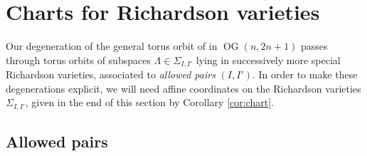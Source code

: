 \documentclass[12pt]{amsart}
\DeclareMathOperator{\OG}{OG}
\newcommand{\CL}[1]{{\color{blue}Carl: #1}}
\begin{document}
\section{Charts for Richardson varieties}\label{sec:charts}

Our degeneration of the general torus orbit of in $\OG(n,2n+1)$ passes through torus orbits of subspaces $\Lambda\in\Sigma_{I,I'}$ lying in successively more special Richardson varieties, associated to \emph{allowed pairs} $(I,I')$. In order to make these degenerations explicit, we will need affine coordinates on the Richardson varieties $\Sigma_{I,I'}$, given in the end of this section by Corollary \ref{cor:chart}.

\subsection{Allowed pairs}\label{sec:allowed_pairs}


\end{document}
